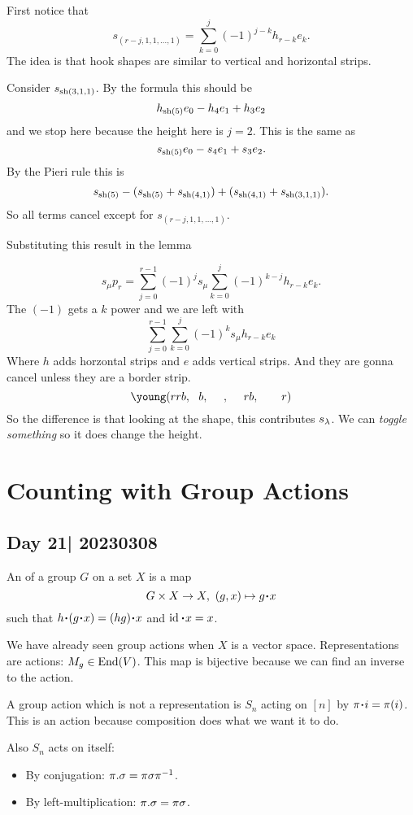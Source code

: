 \documentclass[12pt]{memoir}
\begin{document}
\begin{ptcbp}
    First notice that 
    $$s_{(r-j,1,1,\dots,1)}=\sum_{k=0}^{j}(-1)^{j-k}h_{r-k}e_k.$$
    The idea is that hook shapes are similar to vertical and horizontal strips.
\end{ptcbp}

\begin{Ex}
    Consider $s_{\operatorname{sh}(3,1,1)}$. By the formula this should be 
    $$h_{\operatorname{sh}(5)}e_0-h_4e_1+h_3e_2$$
     and we stop here because the height here is $j=2$. This is the same as 
    $$s_{\operatorname{sh}(5)}e_0-s_4e_1+s_3e_2.$$
    By the Pieri rule this is  
    $$s_{\operatorname{sh}(5)}-(s_{\operatorname{sh}(5)}+s_{\operatorname{sh}(4,1)})+(s_{\operatorname{sh}(4,1)}+s_{\operatorname{sh}(3,1,1)}).$$
    So all terms cancel except for $s_{(r-j,1,1,\dots,1)}$.
\end{Ex}

Substituting this result in the lemma

$$s_\mu p_r=\sum_{j=0}^{r-1}(-1)^js_\mu\sum_{k=0}^{j}(-1)^{k-j}h_{r-k}e_k.$$
The $(-1)$ gets a $k$ power and we are left with 
$$\sum_{j=0}^{r-1}\sum_{k=0}^{j}(-1)^ks_\mu h_{r-k}e_k$$
Where $h$ adds horzontal strips and $e$ adds vertical strips. And they are gonna cancel unless they are a border strip. 
$$\young(rrb,~~b,~~~~,~~~~rb,~~~~~~r)$$
So the difference is that looking at the shape, this contributes $s_\lambda$. We can \emph{toggle something} so it does change the height. 

\chapter{Counting with Group Actions}
\section{Day 21| 20230308}

\begin{Def}
    An  of a group $G$ on a set $X$ is a map 
    $$G\x X\to X,\ (g,x)\mapsto g\.x$$
    such that $h\.(g\. x)=(hg)\.x$ and $\id\. x=x$.
\end{Def}

We have already seen group actions when $X$ is a vector space. Representations are actions: $M_g\in\operatorname{End}(V)$. This map is bijective because we can find an inverse to the action.

\begin{Ex}
    A group action which is not a representation is $S_n$ acting on $[n]$ by $\pi\. i=\pi(i)$. This is an action because composition does what we want it to do.\par 
    Also $S_n$ acts on itself:
    \vspace*{-0.4em}
    \begin{itemize}
        \itemsep=-0.4em
        \item By conjugation: $\pi.\sigma=\pi\sigma\pi^{-1}$.
        \item By left-multiplication: $\pi.\sigma=\pi\sigma$.
    \end{itemize}
\end{Ex}
\end{document}
